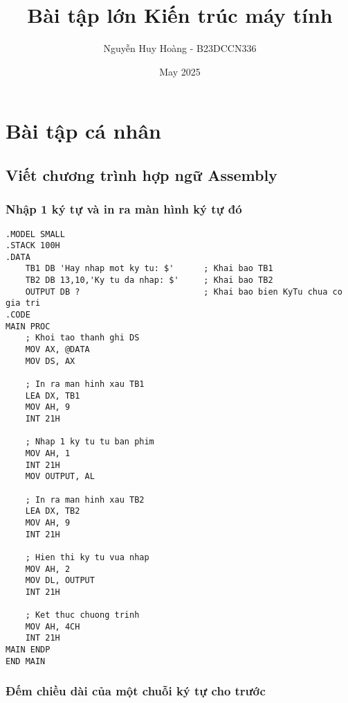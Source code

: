 \documentclass{article}
\begin{document}
\title{\textbf{Bài tập lớn Kiến trúc máy tính}}
\author{Nguyễn Huy Hoàng - B23DCCN336}
\date{May 2025}

\maketitle
\section{Bài tập cá nhân}

\subsection{Viết chương trình hợp ngữ Assembly}

\subsubsection{Nhập 1 ký tự và in ra màn hình ký tự đó}

\begin{lstlisting}[caption={Nhập 1 ký tự và in ra màn hình ký tự đó}]
.MODEL SMALL
.STACK 100H
.DATA
    TB1 DB 'Hay nhap mot ky tu: $'      ; Khai bao TB1
    TB2 DB 13,10,'Ky tu da nhap: $'     ; Khai bao TB2
    OUTPUT DB ?                         ; Khai bao bien KyTu chua co gia tri
.CODE
MAIN PROC
    ; Khoi tao thanh ghi DS
    MOV AX, @DATA
    MOV DS, AX

    ; In ra man hinh xau TB1
    LEA DX, TB1
    MOV AH, 9
    INT 21H

    ; Nhap 1 ky tu tu ban phim
    MOV AH, 1
    INT 21H
    MOV OUTPUT, AL

    ; In ra man hinh xau TB2
    LEA DX, TB2
    MOV AH, 9
    INT 21H

    ; Hien thi ky tu vua nhap
    MOV AH, 2
    MOV DL, OUTPUT
    INT 21H

    ; Ket thuc chuong trinh
    MOV AH, 4CH
    INT 21H
MAIN ENDP
END MAIN
\end{lstlisting}
\newpage

\subsubsection{Đếm chiều dài của một chuỗi ký tự cho trước}
\end{document}
